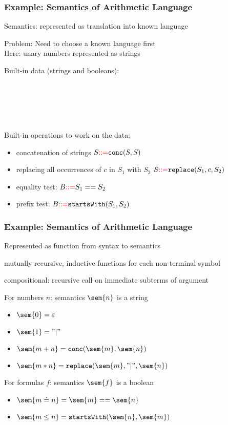 \begin{frame}\frametitle{Example: Semantics of Arithmetic Language}
Semantics: represented as translation into known language
\medskip

Problem: Need to choose a known language first\\
Here: unary numbers represented as strings

Built-in data (strings and booleans):
\begin{commgrammar}
\\
\\
\\
\\
\end{commgrammar}

Built-in operations to work on the data:
\begin{itemize}
\item concatenation of strings $S\bbc \cn{conc}(S,S)$
\item replacing all occurrences of $c$ in $S_1$ with $S_2$ $S\bbc \cn{replace}(S_1,c,S_2)$
\item equality test: $B{\color{red}::=} S_1==S_2$
\item prefix test: $B\bbc \cn{startsWith}(S_1,S_2)$
\end{itemize}
\end{frame}

\begin{frame}\frametitle{Example: Semantics of Arithmetic Language}
\begin{blockitems}{Represented as function from syntax to semantics}
\item mutually recursive, inductive functions for each non-terminal symbol
\item compositional: recursive call on immediate subterms of argument
\end{blockitems}

For numbers $n$: semantics $\sem{n}$ is a string
\begin{itemize}
\item $\sem{0}=\epsilon$
\item $\sem{1}="|"$
\item $\sem{m+n}=\cn{conc}(\sem{m},\sem{n})$
\item $\sem{m*n}=\cn{replace}(\sem{m},"|",\sem{n})$
\end{itemize}
\medskip

For formulas $f$: semantics $\sem{f}$ is a boolean
\begin{itemize}
\item $\sem{m\doteq n}=\sem{m}==\sem{n}$
\item $\sem{m\leq n}=\cn{startsWith}(\sem{n},\sem{m})$
\end{itemize}
\end{frame}

